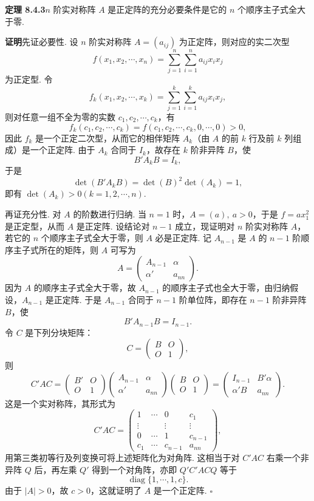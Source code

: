 \documentclass[UTF8,12pt,a4paper,fontset=fandol]{ctexart}
\begin{document}
\noindent\textbf{定理 8.4.3}\quad $n$ 阶实对称阵 $A$ 是正定阵的充分必要条件是它的 $n$ 个顺序主子式全大于零.

\noindent\textbf{证明}\quad 先证必要性. 设 $n$ 阶实对称阵 $A=(a_{ij})$ 为正定阵，则对应的实二次型
\[
f(x_1,x_2,\cdots,x_n)=\sum_{j=1}^n\sum_{i=1}^n a_{ij}x_ix_j
\]
为正定型. 令
\[
f_k(x_1,x_2,\cdots,x_k)=\sum_{j=1}^k\sum_{i=1}^k a_{ij}x_ix_j,
\]
则对任意一组不全为零的实数 $c_1,c_2,\cdots,c_k$，有
\[
f_k(c_1,c_2,\cdots,c_k)=f(c_1,c_2,\cdots,c_k,0,\cdots,0)>0,
\]
因此 $f_k$ 是一个正定二次型，从而它的相伴矩阵 $A_k$（由 $A$ 的前 $k$ 行及前 $k$ 列组成）是一个正定阵. 由于 $A_k$ 合同于 $I_k$，故存在 $k$ 阶非异阵 $B$，使
\[
B'A_kB=I_k,
\]
于是
\[
\det(B'A_kB)=\det(B)^2\det(A_k)=1,
\]
即有 $\det(A_k)>0(k=1,2,\cdots,n)$.

再证充分性. 对 $A$ 的阶数进行归纳. 当 $n=1$ 时，$A=(a),\ a>0$，于是 $f=ax_1^2$ 是正定型，从而 $A$ 是正定阵. 设结论对 $n-1$ 成立，现证明对 $n$ 阶实对称阵 $A$，若它的 $n$ 个顺序主子式全大于零，则 $A$ 必是正定阵. 记 $A_{n-1}$ 是 $A$ 的 $n-1$ 阶顺序主子式所在的矩阵，则 $A$ 可写为
\[
A=\left(\begin{array}{cc}A_{n-1}&\alpha\\ \alpha'&a_{nn}\end{array}\right).
\]
因为 $A$ 的顺序主子式全大于零，故 $A_{n-1}$ 的顺序主子式也全大于零，由归纳假设，$A_{n-1}$ 是正定阵. 于是 $A_{n-1}$ 合同于 $n-1$ 阶单位阵，即存在 $n-1$ 阶非异阵 $B$，使
\[
B'A_{n-1}B=I_{n-1}.
\]
令 $C$ 是下列分块矩阵：
\[
C=\left(\begin{array}{cc}B&O\\ O&1\end{array}\right),
\]
则
\[
C'AC=\left(\begin{array}{cc}B'&O\\ O&1\end{array}\right)
\left(\begin{array}{cc}A_{n-1}&\alpha\\ \alpha'&a_{nn}\end{array}\right)
\left(\begin{array}{cc}B&O\\ O&1\end{array}\right)
=\left(\begin{array}{cc}I_{n-1}&B'\alpha\\ \alpha'B&a_{nn}\end{array}\right).
\]
这是一个实对称阵，其形式为
\[
C'AC=\left(\begin{array}{ccccc}
1&\cdots&0&c_1\\
\vdots&&\vdots&\vdots\\
0&\cdots&1&c_{n-1}\\
c_1&\cdots&c_{n-1}&a_{nn}
\end{array}\right),
\]
用第三类初等行及列变换可将上述矩阵化为对角阵. 这相当于对 $C'AC$ 右乘一个非异阵 $Q$ 后，再左乘 $Q'$ 得到一个对角阵，亦即 $Q'C'ACQ$ 等于
\[
\operatorname{diag}\{1,\cdots,1,c\}.
\]
由于 $|A|>0$，故 $c>0$，这就证明了 $A$ 是一个正定阵. $\square$
\end{document}
